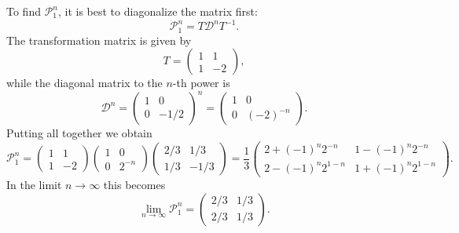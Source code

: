 To find $\mathcal{P}_1^{n}$, it is best to diagonalize the matrix first:
\begin{equation}
    \mathcal{P}_{1}^{n} = T \mathcal{D}^{n} T^{-1}.
\end{equation}
The transformation matrix is given by
\begin{equation}
    T =
    \begin{pmatrix}
        1 & 1 \\
        1 & -2
    \end{pmatrix},
\end{equation}
while the diagonal matrix to the $n$-th power is
\begin{equation}
    \mathcal{D}^{n} =
    \begin{pmatrix}
        1 & 0 \\
        0 & -1/2
    \end{pmatrix}^n
    =
    \begin{pmatrix}
        1 & 0 \\
        0 & (-2)^{-n}
    \end{pmatrix}.
\end{equation}
Putting all together we obtain
\begin{equation}
    \mathcal{P}_{1}^{n} =
    \begin{pmatrix}
        1 & 1 \\
        1 & -2
    \end{pmatrix}
    \begin{pmatrix}
        1 & 0 \\
        0 & 2^{-n}
    \end{pmatrix}
    \begin{pmatrix}
        2/3 & 1/3 \\
        1/3 & -1/3
    \end{pmatrix}
    =\frac{1}{3}
    \begin{pmatrix}
        2 + (-1)^{n} 2^{-n} & 1 - (-1)^{n} 2^{-n} \\
        2 - (-1)^{n} 2^{1-n} & 1 + (-1)^{n} 2^{1-n}
    \end{pmatrix}.
\end{equation}
In the limit $n\to \infty$ this becomes
\begin{equation}
    \lim_{n \to \infty} \mathcal{P}_{1}^{n} =
    \begin{pmatrix}
        2/3 & 1/3 \\
        2/3 & 1/3
    \end{pmatrix}.
\end{equation}

